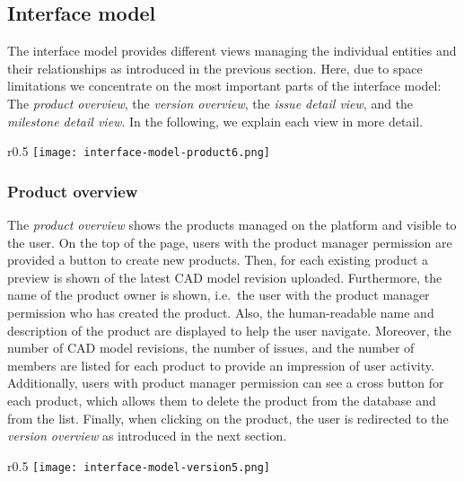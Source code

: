 \subsection{Interface model}
\label{sec:contribution:gui}

The interface model provides different views managing the individual entities and their relationships as introduced in the previous section.
Here, due to space limitations we concentrate on the most important parts of the interface model: The \textit{product overview}, the \textit{version overview}, the \textit{issue detail view}, and the \textit{milestone detail view}.
In the following, we explain each view in more detail.

\begin{wrapfigure}{r}{0.5\textwidth}
    \centering
    \texttt{[image: interface-model-product6.png]}
    \label{fig:screenshot-product}
\end{wrapfigure}

\subsubsection{Product overview}

The \textit{product overview} shows the products managed on the platform and visible to the user.
On the top of the page, users with the product manager permission are provided a button to create new products.
Then, for each existing product a preview is shown of the latest CAD model revision uploaded.
Furthermore, the name of the product owner is shown, i.e.\ the user with the product manager permission who has created the product.
Also, the human-readable name and description of the product are displayed to help the user navigate.
Moreover, the number of CAD model revisions, the number of issues, and the number of members are listed for each product to provide an impression of user activity.
Additionally, users with product manager permission can see a cross button for each product, which allows them to delete the product from the database and from the list.
Finally, when clicking on the product, the user is redirected to the \textit{version overview} as introduced in the next section.

\begin{wrapfigure}{r}{0.5\textwidth}
    \centering
    \texttt{[image: interface-model-version5.png]}
    \label{fig:screenshot-version}
\end{wrapfigure}

